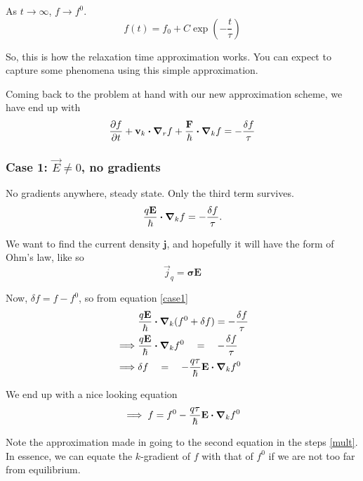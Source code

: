 \documentclass[a4paper]{article}
\newcommand{\hcut}{\hbar}
\begin{document}
As $t\to \infty$, $f\to f^{0}$.
\begin{equation}
	f(t) = f_0 + C\exp(-\frac{t}{\tau})
\end{equation}

So, this is how the relaxation time approximation works. You
can expect to capture some phenomena using this simple approximation.

Coming back to the problem at hand with our new approximation scheme,
we have end up with
\begin{equation}
	\pdv{f}{t} + \mathbf{v}_k\vdot\grad_r f + \frac{\textbf{F}}{\hcut}\vdot\grad_k f = - \frac{\delta f}{\tau}
\end{equation}
\subsubsection*{Case 1: $\vec{E} \neq 0$, no gradients}
No gradients anywhere, steady state. Only the third term survives.
\begin{equation}
	\label{case1}
	\frac{q\mathbf{E}}{\hbar}\vdot\grad_kf = -\frac{\delta f}{\tau}.
\end{equation}

We want to find the current density $\textbf{j}$, and hopefully it
will have the form of Ohm's law, like so
\begin{equation}
	\vec{j}_q = \boldsymbol{\sigma}\mathbf{E} 
\end{equation}

Now, $\delta f = f -  f^{0}$, so from equation \ref{case1}
\begin{equation}
	\label{mult}
	\begin{split}
		&\frac{q\textbf{E}}{\hcut}\vdot\grad_k(f^{0} + \delta f) = -\frac{\delta f}{\tau}\\
		\implies &\frac{q\textbf{E}}{\hcut}\vdot\grad_k f^{0} \quad = \quad -\frac{\delta f}{\tau} \\
		\implies &\delta f \quad = \quad -\frac{q \tau}{\hcut}\textbf{E}\vdot\grad_k f^{0}
	\end{split}
\end{equation}

We end up with a nice looking equation
\begin{equation}
	\label{fzero}
		\implies f = f^{0} - \frac{q\tau}{\hcut}\textbf{E}\vdot\grad_k f^{0}
\end{equation}

Note the approximation made in going to the second equation in
the steps \ref{mult}. In essence, we can equate the $k$-gradient of
$f$ with that of $f^{0}$ if we are not too far from equilibrium.
\end{document}

